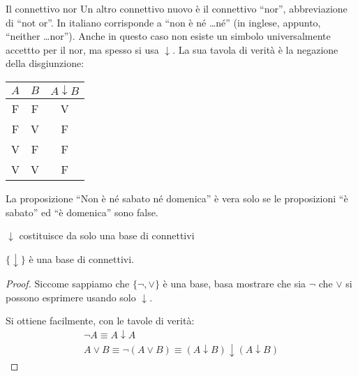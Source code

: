 \documentclass[aspectratio=169,10pt,dvipsnames,xcolor=table,handout]{beamer}
\begin{document}
\begin{frame}{Il connettivo nor}
    Un altro connettivo nuovo è il connettivo ``\alert{nor}'', abbreviazione di ``not or''. In italiano corrisponde a ``\alert{non è né \ldots né}'' (in inglese, appunto, ``neither \ldots nor''). Anche in questo caso non esiste un simbolo universalmente accettto per il nor, ma spesso si usa $\downarrow$. La sua tavola di verità è la negazione della disgiunzione:

    \medskip
    \begin{center}
        \begin{tabular}{c|c||c}
            $A$ & $B$ & $A \downarrow B$ \\
            \hline
            F   & F   & V         \\
            F   & V   & F        \\
            V   & F   & F         \\
            V   & V   & F
        \end{tabular}
    \end{center}

    \begin{example}
        La proposizione ``Non è né sabato né domenica'' è vera solo se le proposizioni ``è sabato'' ed ``è domenica'' sono false.
    \end{example}
\end{frame}

\begin{frame}{$\downarrow$ costituisce da solo una base di connettivi}
    \begin{theorem}
        $\{ \downarrow \}$ è una base di connettivi.
    \end{theorem}
    \begin{proof}
     Siccome sappiamo che $\{\neg, \vee\}$ è una base, basa mostrare che sia $\neg$ che $\vee$ si possono esprimere usando solo $\downarrow$.

    \medskip
    Si ottiene facilmente, con le tavole di verità:
    \begin{gather*}
        \neg A \equiv A \downarrow A\\
        A \vee B \equiv \neg(A \vee B) \equiv (A \downarrow B) \downarrow (A \downarrow B)
    \end{gather*}
    \end{proof}
\end{frame}
\end{document}
